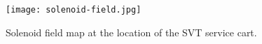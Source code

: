 \begin{figure}[hbt] 
\centering 
\texttt{[image: solenoid-field.jpg]}
\caption{Solenoid field map at the location of the SVT service cart.}
\label{fig:solenoid-field}
\end{figure}








